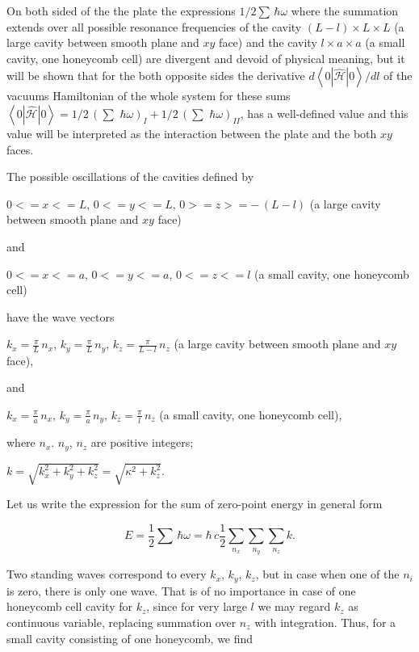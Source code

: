 \documentclass[twoside, 10pt, ptm]{article}
\begin{document}
\begin{multicols}{2}
On both sided of the the plate the expressions \(1\big/2\sum\,\hbar\omega\)
where the summation extends over all possible resonance frequencies of
the cavity \(\left(L-l\right)\times L\times L\) (a large cavity between
smooth plane and \(xy\) face) and the cavity \(l\times a\times a\) (a small
cavity, one honeycomb cell) are divergent and devoid of physical meaning,
but it will be shown that for the both
opposite sides the derivative \({d\left<0|\hat{\mathcal{H}}|0\right>}\big/{dl}\) of
the vacuums Hamiltonian of the whole system for these sums
\(\left<0|\hat{\mathcal{H}}|0\right> = 1\big/2\,\left(\sum\,\,\hbar\omega\right)_{I} + 1\big/2\,\left(\sum\,\,\hbar\omega\right)_{II}\),
has a well-defined value and this value will be
interpreted as the interaction between the plate and the both \(xy\) faces.

    The possible oscillations of the cavities defined by

\(0<=x<=L\), \(0<=y<=L\), \(0>=z>=-\,(L-l)\) (a large cavity between smooth
plane and \(xy\) face)

and

\(0<=x<=a\), \(0<=y<=a\), \(0<=z<=l\) (a small cavity, one honeycomb cell)

    have the wave vectors

\(k_x = \frac{\pi}{L}\,n_x\), \(k_y = \frac{\pi}{L}\,n_y\),
\(k_z = \frac{\pi}{L-l}\,n_z\) (a large cavity between smooth plane and
\(xy\) face),

and

\(k_x = \frac{\pi}{a}\,n_x\), \(k_y = \frac{\pi}{a}\,n_y\),
\(k_z = \frac{\pi}{l}\,n_z\) (a small cavity, one honeycomb cell),

where \(n_x\). \(n_y\), \(n_z\) are positive integers;

\(k = \sqrt{k_x^2+k_y^2+k_z^2} = \sqrt{\kappa^2+k_z^2}\).

Let us write the expression for the sum of zero-point energy in general form

\begin{equation}
E = \frac{1}{2}\sum\,\hbar\omega = \hbar\,c\frac{1}{2}\sum\limits_{n_x}^{}\sum\limits_{n_y}^{}\sum\limits_{n_z}^{}k.
\end{equation}

    Two standing waves correspond to every \(k_x\), \(k_y\), \(k_z\), but in case when
one of the \(n_i\) is zero, there is only one wave. That is of no importance
in case of one honeycomb cell cavity for \(k_z\),
since for very large \(l\) we may regard \(k_z\) as
continuous variable, replacing summation over \(n_z\) with integration.
Thus, for a small cavity consisting of one honeycomb, we find


\end{multicols}
\end{document}
